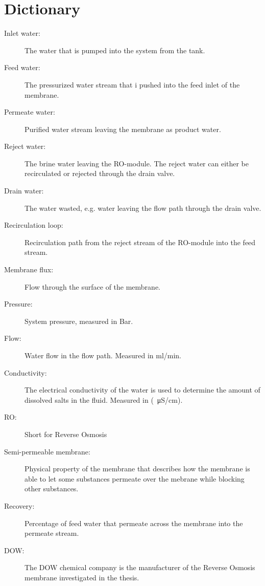 

\section*{Dictionary}


\begin{description}
\item [Inlet water:] The water that is pumped into the system from the tank.
\item [Feed water:] The pressurized water stream that i pushed into the feed inlet of the membrane.
\item [Permeate water:]  Purified water stream leaving the membrane as product water.
\item [Reject water:] The brine water leaving the RO-module. The reject water can either be recirculated or rejected through the drain valve.
\item [Drain water:] The water wasted, e.g. water leaving the flow path through the drain valve.
\item [Recirculation loop:] Recirculation path from the reject stream of the RO-module into the feed stream.
\item [Membrane flux:] Flow through the surface of the membrane.
\item [Pressure:]  System pressure, measured in Bar.
\item [Flow:] Water flow in the flow path. Measured in ml/min.
\item [Conductivity:] The electrical conductivity of the water is used to determine the amount of dissolved salts in the fluid. Measured in  (\SI{}{\micro\siemens}/cm).
\item [RO:] Short for Reverse Osmosis
\item [Semi-permeable membrane:] Physical property of the membrane that describes how the membrane is able to let some substances permeate over the mebrane while blocking other substances.
\item [Recovery:] Percentage of feed water that permeate across the membrane into the permeate stream.
\item [DOW:] The DOW chemical company is the manufacturer of the Reverse Osmosis membrane investigated in the thesis.

\end{description}



